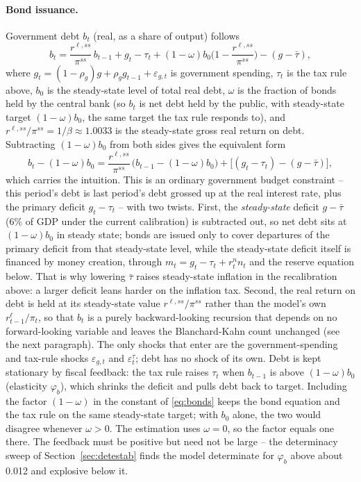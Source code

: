 \documentclass[11pt]{article}
\begin{document}
\paragraph{Bond issuance.} Government debt $b_t$ (real, as a share of
output) follows
\begin{equation}
b_t = \frac{r^{\ell,ss}}{\pi^{ss}}\,b_{t-1} + g_t - \tau_t
+ (1-\omega)b_0\Big(1-\frac{r^{\ell,ss}}{\pi^{ss}}\Big) - (g-\bar\tau),
\label{eq:bonds}
\end{equation}
where $g_t=(1-\rho_g)g+\rho_g g_{t-1}+\varepsilon_{g,t}$ is government
spending, $\tau_t$ is the tax rule above, $b_0$ is the steady-state level of
total real debt, $\omega$ is the fraction of bonds held by the central bank
(so $b_t$ is net debt held by the public, with steady-state target
$(1-\omega)b_0$, the same target the tax rule responds to), and
$r^{\ell,ss}/\pi^{ss}=1/\beta\approx1.0033$ is the steady-state gross real
return on debt. Subtracting $(1-\omega)b_0$ from both sides gives the
equivalent form
\[
b_t-(1-\omega)b_0 = \frac{r^{\ell,ss}}{\pi^{ss}}\,\big(b_{t-1}-(1-\omega)b_0\big)
+ \big[(g_t-\tau_t)-(g-\bar\tau)\big],
\]
which carries the intuition. This is an ordinary government budget
constraint -- this period's debt is last period's debt grossed up at the
real interest rate, plus the primary deficit $g_t-\tau_t$ -- with two twists.
First, the \emph{steady-state} deficit $g-\bar\tau$ (6\% of GDP under the
current calibration) is subtracted out, so net debt sits at $(1-\omega)b_0$
in steady state; bonds are issued only to cover departures of the primary deficit from
that steady-state level, while the steady-state deficit itself is financed by
money creation, through $m_t=g_t-\tau_t+r^n_tn_t$ and the reserve equation
below. That is why lowering $\bar\tau$ raises steady-state inflation in the
recalibration above: a larger deficit leans harder on the inflation tax.
Second, the real return on debt is held at its steady-state value
$r^{\ell,ss}/\pi^{ss}$ rather than the model's own $r^\ell_{t-1}/\pi_t$, so
that $b_t$ is a purely backward-looking recursion that depends on no
forward-looking variable and leaves the Blanchard-Kahn count unchanged
(see the next paragraph). The only shocks that enter are the
government-spending and tax-rule shocks $\varepsilon_{g,t}$ and
$\varepsilon^\tau_t$; debt has no shock of its own. Debt is kept stationary
by fiscal feedback: the tax rule raises $\tau_t$ when $b_{t-1}$ is above
$(1-\omega)b_0$ (elasticity $\varphi_b$), which shrinks the deficit and pulls
debt back to target. Including the factor $(1-\omega)$ in the constant of
\eqref{eq:bonds} keeps the bond equation and the tax rule on the same
steady-state target; with $b_0$ alone, the two would disagree whenever
$\omega>0$. The estimation uses $\omega=0$, so the factor equals one there. The feedback must be positive but need not be large -- the
determinacy sweep of Section~\ref{sec:detestab} finds the model determinate
for $\varphi_b$ above about 0.012 and explosive below it.
\end{document}
